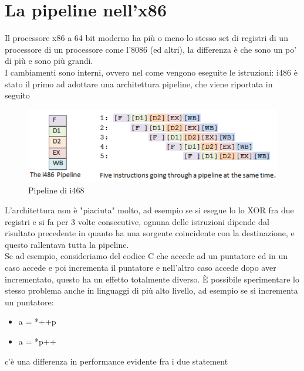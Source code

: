 \documentclass[12pt, oneside]{extbook}
\begin{document}
\section{La pipeline nell'x86}
Il processore x86 a 64 bit moderno ha più o meno lo stesso set di registri di un processore di un processore come l'8086 (ed altri), la differenza è che sono un po' di più e sono più grandi.\\ I cambiamenti sono interni, ovvero nel come vengono eseguite le istruzioni: i486 è stato il primo ad adottare una architettura pipeline, che viene riportata in seguito
\begin{figure}[!h]
\includegraphics[scale=0.4]{immagini/pipeline-i486}
\caption{Pipeline di i468}
\end{figure}
L'architettura non è "piaciuta" molto, ad esempio se si esegue lo lo XOR fra due registri e si fa per 3 volte consecutive, ognuna delle istruzioni dipende dal risultato precedente in quanto ha una sorgente coincidente con la destinazione, e questo rallentava tutta la pipeline.\\ Se ad esempio, consideriamo del codice C che accede ad un puntatore ed in un caso accede e poi incrementa il puntatore e nell'altro caso accede dopo aver incrementato, questo ha un effetto totalmente diverso. È possibile sperimentare lo stesso problema anche in linguaggi di più alto livello, ad esempio se si incrementa un puntatore:
\begin{itemize}
\item a = *++p
\item a = *p++
\end{itemize}
c'è una differenza in performance evidente fra i due statement
\end{document}
